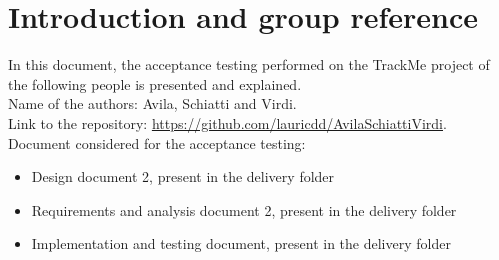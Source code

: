 \section{Introduction and group reference}
In this document, the acceptance testing performed on the TrackMe project of the following people is presented and explained. \\

Name of the authors: Avila, Schiatti and Virdi.  \\
Link to the repository: \url{https://github.com/lauricdd/AvilaSchiattiVirdi}. \\
Document considered for the acceptance testing:
\begin{itemize}
\item Design document 2, present in the delivery folder
\item Requirements and analysis document 2, present in the delivery folder
\item Implementation and testing document, present in the delivery folder
\end{itemize}

